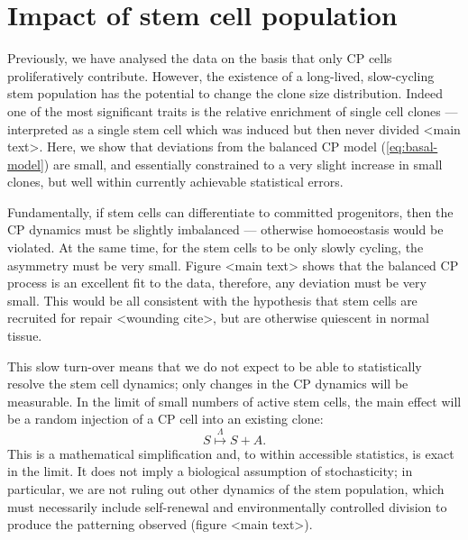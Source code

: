 \documentclass[10pt,UKenglish]{article}
\begin{document}
\section{\label{sec:stem}Impact of stem cell population}

Previously, we have analysed the data on the basis that only CP cells
proliferatively contribute. However, the existence of a long-lived, slow-cycling
stem population has the potential to change the clone size distribution. Indeed
one of the most significant traits is the relative enrichment of single cell
clones --- interpreted as a single stem cell which was induced but then never
divided <main text>. Here, we show that deviations from the balanced CP model
(\ref{eq:basal-model}) are small, and essentially constrained to a very slight
increase in small clones, but well within currently achievable statistical
errors.

Fundamentally, if stem cells can differentiate to committed progenitors, then
the CP dynamics must be slightly imbalanced --- otherwise homoeostasis would be
violated. At the same time, for the stem cells to be only slowly cycling, the
asymmetry must be very small. Figure <main text> shows that the balanced CP
process is an excellent fit to the data, therefore, any deviation must be very
small. This would be all consistent with the hypothesis that stem cells are
recruited for repair <wounding cite>, but are otherwise quiescent in normal
tissue.

This slow turn-over means that we do not expect to be able to statistically
resolve the stem cell dynamics; only changes in the CP dynamics will be
measurable. In the limit of small numbers of active stem cells, the main effect
will be a random injection of a CP cell into an existing clone: 
\begin{equation}
S \overset{\Lambda}{\longmapsto} S+A. \label{eq:stem-division-model}
\end{equation}
This is a mathematical simplification and, to within accessible statistics, is
exact in the limit. It does not imply a biological assumption of stochasticity;
in particular, we are not ruling out other dynamics of the stem population,
which must necessarily include self-renewal and environmentally controlled
division to produce the patterning observed (figure <main text>).
\end{document}
